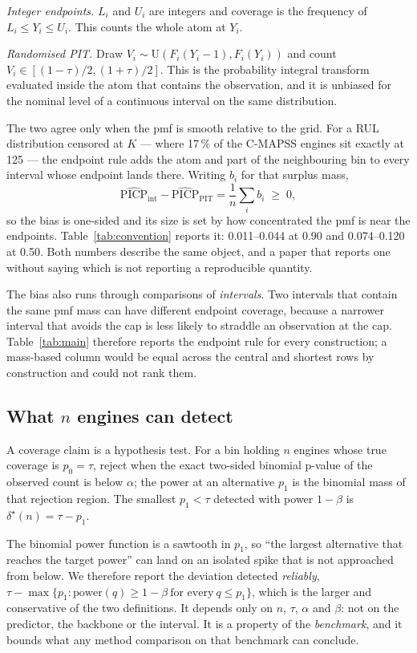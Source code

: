 \documentclass[journal]{IEEEtran}
\newcommand{\dx}{\delta^{\star}}
\begin{document}
\emph{Integer endpoints.} $L_i$ and $U_i$ are integers and coverage is the frequency of
$L_i\le Y_i\le U_i$. This counts the whole atom at $Y_i$.

\emph{Randomised PIT.} Draw $V_i\sim\mathrm{U}(F_i(Y_i-1),F_i(Y_i))$ and count
$V_i\in[(1-\tau)/2,(1+\tau)/2]$. This is the probability integral transform evaluated inside
the atom that contains the observation, and it is unbiased for the nominal level of a
continuous interval on the same distribution.

The two agree only when the pmf is smooth relative to the grid. For a RUL distribution
censored at $K$ --- where 17\,\% of the C-MAPSS engines sit exactly at 125 --- the endpoint
rule adds the atom and part of the neighbouring bin to every interval whose endpoint lands
there. Writing $b_i$ for that surplus mass,
\begin{equation}
\widehat{\mathrm{PICP}}_{\text{int}}-\widehat{\mathrm{PICP}}_{\text{PIT}}
=\frac1n\sum_i b_i\;\ge\;0,
\end{equation}
so the bias is one-sided and its size is set by how concentrated the pmf is near the
endpoints. Table~\ref{tab:convention} reports it: 0.011--0.044 at 0.90 and 0.074--0.120 at
0.50. Both numbers describe the same object, and a paper that reports one without saying
which is not reporting a reproducible quantity.

The bias also runs through comparisons of \emph{intervals}. Two intervals that contain the
same pmf mass can have different endpoint coverage, because a narrower interval that avoids
the cap is less likely to straddle an observation at the cap. Table~\ref{tab:main} therefore
reports the endpoint rule for every construction; a mass-based column would be equal across
the central and shortest rows by construction and could not rank them.

\subsection{What \texorpdfstring{$n$}{n} engines can detect}

A coverage claim is a hypothesis test. For a bin holding $n$ engines whose true coverage is
$p_0=\tau$, reject when the exact two-sided binomial p-value of the observed count is below
$\alpha$; the power at an alternative $p_1$ is the binomial mass of that rejection region.
The smallest $p_1<\tau$ detected with power $1-\beta$ is $\dx(n)=\tau-p_1$.

The binomial power function is a sawtooth in $p_1$, so ``the largest alternative that reaches
the target power'' can land on an isolated spike that is not approached from below. We
therefore report the deviation detected \emph{reliably},
$\tau-\max\{p_1:\text{power}(q)\ge1-\beta\ \text{for every}\ q\le p_1\}$, which is the larger
and conservative of the two definitions. It depends only on $n$, $\tau$, $\alpha$ and $\beta$:
not on the predictor, the backbone or the interval. It is a property of the
\emph{benchmark}, and it bounds what any method comparison on that benchmark can conclude.
\end{document}
